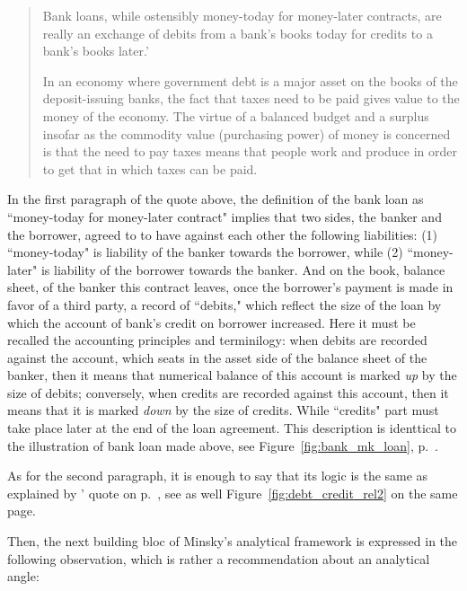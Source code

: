 \begin{quote}
Bank loans, while ostensibly money-today for money-later contracts, are really an exchange of debits from a bank's books today for credits to a bank's books later.'\par In an economy where government debt is a major asset on the books of the deposit-issuing banks, the fact that taxes need to be paid gives value to the money of the economy. The virtue of a balanced budget and a surplus insofar as the commodity value (purchasing power) of money is concerned is that the need to pay taxes means that people work and produce in order to get that in which taxes can be paid.~\citep[p.~258, including footnote 10]{minsky1986}
\end{quote}

In the first paragraph of the quote above, the definition of the bank loan as ``money-today for money-later contract" implies that two sides, the banker and the borrower, agreed to to have against each other the following liabilities: (1) ``money-today" is liability of the banker towards the borrower, while (2) ``money-later" is liability of the borrower towards the banker. And on the book, balance sheet, of the banker this contract leaves, once the borrower's payment is made in favor of a third party, a record of ``debits," which reflect the size of the loan by which the account of bank's credit on borrower increased. Here it must be recalled the accounting principles and terminilogy: when debits are recorded against the account, which seats in the asset side of the balance sheet of the banker, then it means that numerical balance of this account is marked \textit{up} by the size of debits; conversely, when credits are recorded against this account, then it means that it is marked \textit{down} by the size of credits. While ``credits" part must take place later at the end of the loan agreement. This description is identtical to the illustration of bank loan made above, see Figure~\ref{fig:bank_mk_loan}, p.~\pageref{fig:bank_mk_loan}.

As for the second paragraph, it is enough to say that its logic is the same as explained by \citeauthor{innes1913}' quote on p.~\pageref{fig:debt_credit_rel2}, see as well Figure~\ref{fig:debt_credit_rel2} on the same page.

Then, the next building bloc of Minsky's analytical framework is expressed in the following observation, which is rather a recommendation about an analytical angle:

